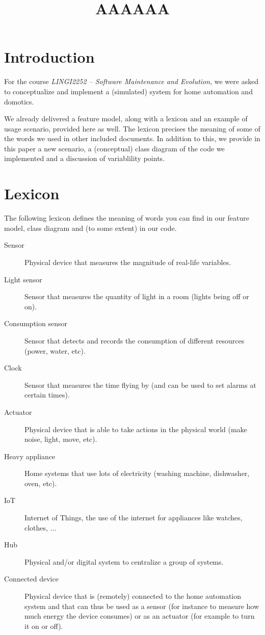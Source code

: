     \title{AAAAAA}
    \newpage

	\section{Introduction}
		For the course \textit{LINGI2252 -- Software Maintenance and Evolution}, we were asked to conceptualize and implement a (simulated) system for home automation and domotics.
		
		We already delivered a feature model, along with a lexicon and an example of usage scenario, provided here as well. The lexicon precises the meaning of some of the words we used in other included documents.
		In addition to this, we provide in this paper a new scenario, a (conceptual) class diagram of the code we implemented and a discussion of variablility points.

	\section{Lexicon}
		The following lexicon defines the meaning of words you can find in our feature model, class diagram and (to some extent) in our code.

		\begin{description}
            \item[Sensor] Physical device that measures the magnitude of real-life variables.
            \item[Light sensor] Sensor that measures the quantity of light in a room (lights being off or on).
            \item[Consumption sensor] Sensor that detects and records the consumption of different resources (power, water, etc).
            \item[Clock] Sensor that measures the time flying by (and can be used to set alarms at certain times).
            \item[Actuator] Physical device that is able to take actions in the physical world (make noise, light, move, etc).
            \item[Heavy appliance] Home systems that use lots of electricity (washing machine, dishwasher, oven, etc).
            \item[IoT] Internet of Things, the use of the internet for appliances like watches, clothes, ...
            \item[Hub] Physical and/or digital system to centralize a group of systems.
            \item[Connected device] Physical device that is (remotely) connected to the home automation system and that can thus be used as a sensor (for instance to measure how much energy the device consumes) or as an actuator (for example to turn it on or off).
        \end{description}

